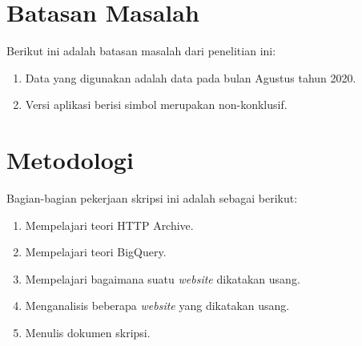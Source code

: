 \section{Batasan Masalah}
\label{sec:batasan}
Berikut ini adalah batasan masalah dari penelitian ini:
\begin{enumerate}
    \item Data yang digunakan adalah data pada bulan Agustus tahun 2020.
    \item Versi aplikasi berisi simbol merupakan non-konklusif.
\end{enumerate}

\section{Metodologi}
\label{sec:metlit}
Bagian-bagian pekerjaan skripsi ini adalah sebagai berikut:
\begin{enumerate}
	\item Mempelajari teori HTTP Archive.
	\item Mempelajari teori BigQuery.
	\item Mempelajari bagaimana suatu \textit{website} dikatakan usang.
	\item Menganalisis beberapa \textit{website} yang dikatakan usang.
	\item Menulis dokumen skripsi.
\end{enumerate}


